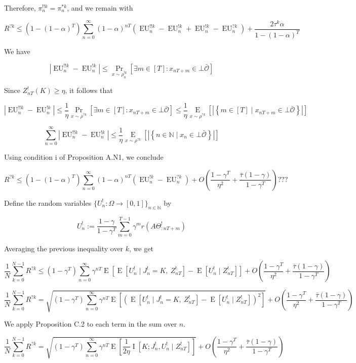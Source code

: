 \documentclass[a4paper]{article}
\newcommand{\AP}[1]{\left(#1\right)}
\newcommand{\AB}[1]{\left[#1\right]}
\newcommand{\AC}[1]{\left\{#1\right\}}
\newcommand{\E}[1]{\underset{#1}{\operatorname{E}}}
\newcommand{\Ea}[2]{\underset{#1}{\operatorname{E}}\AB{#2}}
\newcommand{\I}[1]{\underset{#1}{\operatorname{I}}}
\newcommand{\Nats}{\mathbb{N}}
\newcommand{\Sq}[2]{\{#1\}_{#2 \in \Nats}}
\newcommand{\Sqn}[1]{\Sq{#1}{n}}
\newcommand{\Abs}[1]{\left\vert #1 \right\vert}
\newcommand{\Ob}{\mathcal{O}}
\newcommand{\Ado}{\bar{\Ob}}
\newcommand{\EU}{\operatorname{EU}}
\newcommand{\Z}{Z}
\newcommand{\J}{J}
\begin{document}
Therefore, $\pi^{!!k}_n = \pi^{*k}_n$, and we remain with

$$R^{?k} \leq\AP{1-(1-\alpha)^T}\sum_{n=0}^\infty (1-\alpha)^{nT} \left(\EU^{!!k}_n-\EU^{!k}_n+\EU^{!k}_n-\EU^{?k}_n\right) + \frac{2\tau^k\alpha}{1-(1-\alpha)^T}$$

We have

$$\Abs{\EU^{!!k}_n-\EU^{!k}_n} \leq \Pr_{x\sim\rho^{!k}_n}\left[\exists m \in [T]: x_{nT+m} \in \bot\Ado\right]$$

Since $\Z_{nT}^{!}(K) \geq \eta$, it follows that

$$\Abs{\EU^{!!k}_n-\EU^{!k}_n} \leq \frac{1}{\eta}\Pr_{x\sim\rho^{?k}}\left[\exists m \in [T]: x_{nT+m} \in \bot\Ado\right] \leq \frac{1}{\eta}\Ea{x\sim\rho^{?k}}{\Abs{\AC{m \in [T] \mid x_{nT+m} \in \bot\Ado}}}$$

$$\sum_{n=0}^\infty \Abs{\EU^{!!k}_n-\EU^{!k}_n} \leq \frac{1}{\eta}\Ea{x\sim\rho^{?k}}{\Abs{\AC{n \in \Nats \mid x_n \in \bot\Ado}}}$$

Using condition i of Proposition A.N1, we conclude

$$R^{?k} \leq\AP{1-(1-\alpha)^T}\sum_{n=0}^\infty (1-\alpha)^{nT} \left(\EU^{!k}_n-\EU^{?k}_n\right) + O\left(\frac{1-\gamma^T}{\eta^2}+\frac{\bar{\tau}(1-\gamma)}{1-\gamma^T}\right)???$$

Define the random variables $\Sqn{U^!_n : \Omega \rightarrow [0,1]}$ by 

$$U^!_n:=\frac{1-\gamma}{1-\gamma^T}\sum_{m=0}^{T-1} \gamma^{m} r\left(A\Theta^!_{:nT+m}\right)$$

Averaging the previous inequality over $k$, we get

$$\frac{1}{N}\sum_{k=0}^{N-1}R^{?k} \leq (1-\gamma^T)\sum_{n=0}^\infty \gamma^{nT} \E{}\left[\E{}\left[U^!_n \mid \J^!_n = K,\ Z^!_{nT}\right]-\E{}\left[U^!_n \mid Z^!_{nT}\right]\right] + O\left(\frac{1-\gamma^T}{\eta^2}+\frac{\bar{\tau}(1-\gamma)}{1-\gamma^T}\right)$$

$$\frac{1}{N}\sum_{k=0}^{N-1}R^{?k} = \sqrt{(1-\gamma^T)\sum_{n=0}^\infty \gamma^{nT} \E{}\left[\left(\E{}\left[U^!_n \mid \J^!_n = K,\ Z^!_{nT}\right]-\E{}\left[U^!_n \mid Z^!_{nT}\right]\right)^2\right]} + O\left(\frac{1-\gamma^T}{\eta^2}+\frac{\bar{\tau}(1-\gamma)}{1-\gamma^T}\right)$$

We apply Proposition C.2 to each term in the sum over $n$.

$$\frac{1}{N}\sum_{k=0}^{N-1}R^{?k} = \sqrt{(1-\gamma^T)\sum_{n=0}^\infty \gamma^{nT} \E{}\left[\frac{1}{2\eta}\I{}\left[K;\J^!_n,U^!_n \mid Z^!_{nT}\right]\right]} + O\left(\frac{1-\gamma^T}{\eta^2}+\frac{\bar{\tau}(1-\gamma)}{1-\gamma^T}\right)$$
\end{document}
